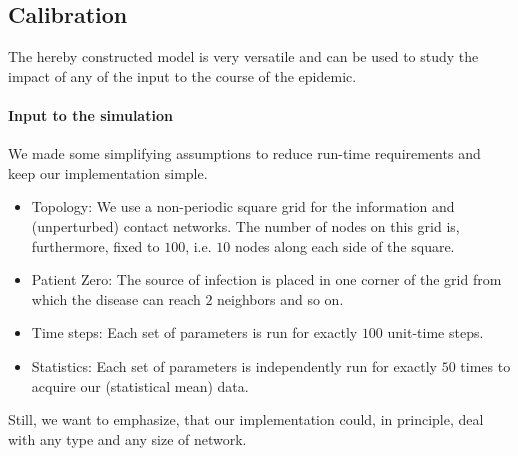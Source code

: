 \documentclass[11pt]{article}
\begin{document}
\subsection{Calibration}
The hereby constructed model is very versatile and can be used to study the impact of any of the input to the course of the epidemic.

\paragraph*{Input to the simulation}
We made some simplifying assumptions to reduce run-time requirements and keep our implementation simple.

\begin{itemize}
  \item Topology: We use a non-periodic square grid for the information and (unperturbed) contact networks. The number of nodes on this grid is, furthermore, fixed to $100$, i.e. $10$ nodes along each side of the square.
  \item Patient Zero: The source of infection is placed in one corner of the grid from which the disease can reach $2$ neighbors and so on.
  \item Time steps: Each set of parameters is run for exactly $100$ unit-time steps.
  \item Statistics: Each set of parameters is independently run for exactly $50$ times to acquire our (statistical mean) data.
\end{itemize}

Still, we want to emphasize, that our implementation could, in principle, deal with any type and any size of network.
\end{document}
